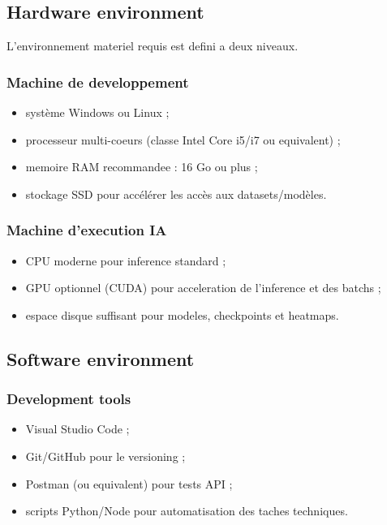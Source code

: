 \subsection{Hardware environment}
L'environnement materiel requis est defini a deux niveaux.

\subsubsection*{Machine de developpement}
\begin{itemize}
    \item système Windows ou Linux ;
    \item processeur multi-coeurs (classe Intel Core i5/i7 ou equivalent) ;
    \item memoire RAM recommandee : 16 Go ou plus ;
    \item stockage SSD pour accélérer les accès aux datasets/modèles.
\end{itemize}

\subsubsection*{Machine d'execution IA}
\begin{itemize}
    \item CPU moderne pour inference standard ;
    \item GPU optionnel (CUDA) pour acceleration de l'inference et des batchs ;
    \item espace disque suffisant pour modeles, checkpoints et heatmaps.
\end{itemize}

\subsection{Software environment}

\subsubsection*{Development tools}
\begin{itemize}
    \item Visual Studio Code ;
    \item Git/GitHub pour le versioning ;
    \item Postman (ou equivalent) pour tests API ;
    \item scripts Python/Node pour automatisation des taches techniques.
\end{itemize}

